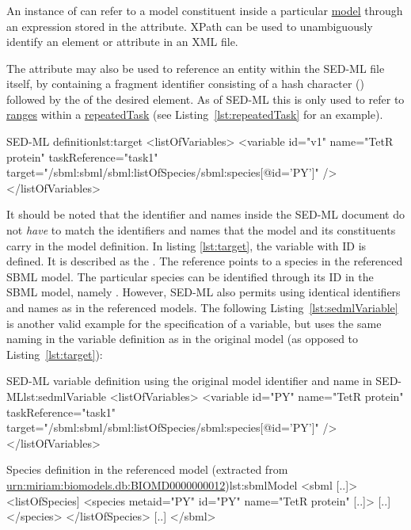 \subsubsection{}
\label{sec:target}
An instance of  can refer to a model constituent inside a particular \hyperref[class:model]{model} through an  expression stored in the  attribute. 
%
XPath can be used to unambiguously identify an element or attribute in an XML file.

The  attribute may also be used to reference an entity within the SED-ML file itself, by containing a fragment identifier consisting of a hash character (\code{\#}) followed by the  of the desired element.
As of SED-ML \LoneVtwo this is only used to refer to \hyperref[sec:ranges]{ranges} within a \hyperref[class:repeatedTask]{repeatedTask} (see Listing~\ref{lst:repeatedTask} for an example).


%
\begin{myXmlLst}{SED-ML  definition}{lst:target}
  <listOfVariables>
    <variable id="v1" name="TetR protein" taskReference="task1" 
      target="/sbml:sbml/sbml:listOfSpecies/sbml:species[@id='PY']" />
  </listOfVariables>
\end{myXmlLst}
%
It should be noted that the identifier and names inside the SED-ML document do not \emph{have} to match the identifiers and names that the model and its constituents carry in the model definition.
In listing \vref{lst:target}, the variable with ID  is defined. It is described as the . The reference points to a species in the referenced SBML model. The particular species can be identified through its ID in the SBML model, namely .
However, SED-ML also permits using identical identifiers and names as in the referenced models. The following Listing~\vref{lst:sedmlVariable} is another valid example for the specification of a variable, but uses the same naming in the variable definition as in the original model (as opposed to Listing~\ref{lst:target}):
%
\begin{myXmlLst}{SED-ML variable definition using the original model identifier and name in SED-ML}{lst:sedmlVariable}
   <listOfVariables>
    <variable id="PY" name="TetR protein"  taskReference="task1" 
     target="/sbml:sbml/sbml:listOfSpecies/sbml:species[@id='PY']" />
   </listOfVariables>
\end{myXmlLst}
%

%
\begin{myXmlLst}{Species definition in the referenced model (extracted from \url{urn:miriam:biomodels.db:BIOMD0000000012})}{lst:sbmlModel}
<sbml [..]>
 <listOfSpecies]
  <species metaid="PY" id="PY" name="TetR protein" [..]>
   [..]
  </species>
 </listOfSpecies>
 [..]
</sbml>
\end{myXmlLst}
%

